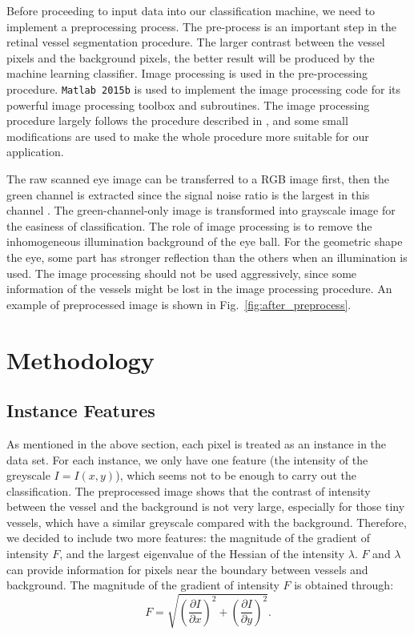 \documentclass[12pt, notitlepage]{article}
\newcommand{\fref}[1]{Fig.~\ref{#1}}
\begin{document}
Before proceeding to input data into our classification machine, we need to implement a preprocessing process.  The pre-process is an important step in the retinal vessel segmentation procedure. The larger contrast between the vessel pixels and the background pixels, the better result will be produced by the machine learning classifier. Image processing is used in the pre-processing procedure. \verb|Matlab 2015b| is used to implement the image processing code for its powerful image processing toolbox and subroutines. The image processing procedure largely follows the procedure described in \cite{marin2011new}, and some small modifications are used to make the whole procedure more suitable for our application. 

The raw scanned eye image can be transferred to a RGB image first, then the green channel is extracted since the signal noise ratio is the largest in this channel \cite{marin2011new,ricci2007retinal}. The green-channel-only image is transformed into grayscale image for the easiness of classification.  The role of image processing is to remove the inhomogeneous illumination background of the eye ball.  For the geometric shape the eye, some part has stronger reflection than the others when an illumination is used. The image processing should not be used aggressively, since some information of the vessels might be lost in the image processing procedure.  An example of preprocessed image is shown in \fref{fig:after_preprocess}.




\section{Methodology}

\subsection{Instance Features}

As mentioned in the above section, each pixel is treated as an instance in the data set. For each instance, we only have one feature (the intensity of the greyscale $I = I(x,y)$), which seems not to be enough to carry out the classification. The preprocessed image shows that the contrast of intensity between the vessel and the background is not very large, especially for those tiny vessels, which have a similar greyscale compared with the background. Therefore, we decided to include two more features: the magnitude of the gradient of intensity $F$,  and the largest eigenvalue of the Hessian of the intensity $\lambda$. $F$ and $\lambda$ can provide information for pixels near the boundary between vessels and background.  The magnitude of the gradient of intensity $F$ is obtained through:  
\begin{equation}
F = \sqrt{\left(\frac{\partial I}{\partial x}\right)^2 + \left(\frac{\partial I}{\partial y}\right)^2} . 
\end{equation}
\end{document}
